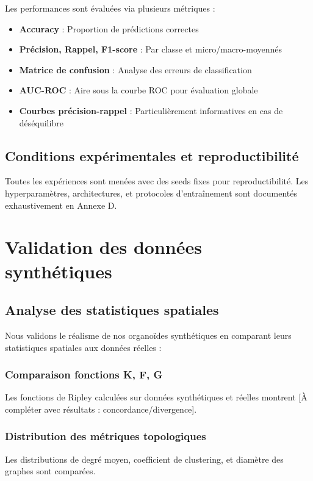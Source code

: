Les performances sont évaluées via plusieurs métriques :
\begin{itemize}
    \item \textbf{Accuracy} : Proportion de prédictions correctes
    \item \textbf{Précision, Rappel, F1-score} : Par classe et micro/macro-moyennés
    \item \textbf{Matrice de confusion} : Analyse des erreurs de classification
    \item \textbf{AUC-ROC} : Aire sous la courbe ROC pour évaluation globale
    \item \textbf{Courbes précision-rappel} : Particulièrement informatives en cas de déséquilibre
\end{itemize}

\subsection{Conditions expérimentales et reproductibilité}

Toutes les expériences sont menées avec des seeds fixes pour reproductibilité. Les hyperparamètres, architectures, et protocoles d'entraînement sont documentés exhaustivement en Annexe D.

\section{Validation des données synthétiques}

\subsection{Analyse des statistiques spatiales}

Nous validons le réalisme de nos organoïdes synthétiques en comparant leurs statistiques spatiales aux données réelles :

\subsubsection{Comparaison fonctions K, F, G}
Les fonctions de Ripley calculées sur données synthétiques et réelles montrent [À compléter avec résultats : concordance/divergence].

\subsubsection{Distribution des métriques topologiques}
Les distributions de degré moyen, coefficient de clustering, et diamètre des graphes sont comparées.

